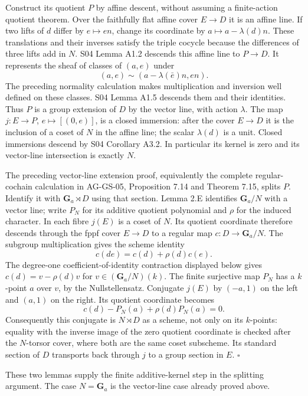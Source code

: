 \documentclass[11pt,a4paper,openany]{report}
\begin{document}
Construct its quotient \(P\) by affine descent, without assuming a finite-action quotient theorem. Over the faithfully flat affine cover \(E\to D\) it is an affine line. If two lifts of \(d\) differ by \(e\mapsto en\), change its coordinate by \(a\mapsto a-\lambda(d)n\). These translations and their inverses satisfy the triple cocycle because the differences of three lifts add in \(N\). S04 Lemma A1.2 descends this affine line to \(P\to D\). It represents the sheaf of classes of \((a,e)\) under \[
(a,e)\sim(a-\lambda(\bar e)n,en).
\] The preceding normality calculation makes multiplication and inversion well defined on these classes. S04 Lemma A1.5 descends them and their identities. Thus \(P\) is a group extension of \(D\) by the vector line, with action \(\lambda\). The map \(j:E\to P\), \(e\mapsto[(0,e)]\), is a closed immersion: after the cover \(E\to D\) it is the inclusion of a coset of \(N\) in the affine line; the scalar \(\lambda(d)\) is a unit. Closed immersions descend by S04 Corollary A3.2. In particular its kernel is zero and its vector-line intersection is exactly \(N\).

The preceding vector-line extension proof, equivalently the complete regular-cochain calculation in AG-GS-05, Proposition 7.14 and Theorem 7.15, splits \(P\). Identify it with \(\mathbf G_a\rtimes D\) using that section. Lemma 2.E identifies \(\mathbf G_a/N\) with a vector line; write \(P_N\) for its additive quotient polynomial and \(\rho\) for the induced character. In each fibre \(j(E)\) is a coset of \(N\). Its quotient coordinate therefore descends through the fppf cover \(E\to D\) to a regular map \(c:D\to\mathbf G_a/N\). The subgroup multiplication gives the scheme identity \[
c(de)=c(d)+\rho(d)c(e).
\] The degree-one coefficient-of-identity contraction displayed below gives \(c(d)=v-\rho(d)v\) for \(v\in(\mathbf G_a/N)(k)\). The finite surjective map \(P_N\) has a \(k\)-point \(a\) over \(v\), by the Nullstellensatz. Conjugate \(j(E)\) by \((-a,1)\) on the left and \((a,1)\) on the right. Its quotient coordinate becomes \[
c(d)-P_N(a)+\rho(d)P_N(a)=0.
\] Consequently this conjugate is \(N\rtimes D\) as a scheme, not only on its \(k\)-points: equality with the inverse image of the zero quotient coordinate is checked after the \(N\)-torsor cover, where both are the same coset subscheme. Its standard section of \(D\) transports back through \(j\) to a group section in \(E\). \(\square\)

These two lemmas supply the finite additive-kernel step in the splitting argument. The case \(N=\mathbf G_a\) is the vector-line case already proved above.
\end{document}
